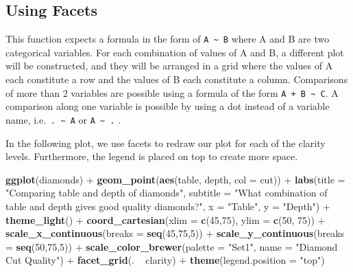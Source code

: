 \documentclass[]{tufte-book}
\newenvironment{Shaded}{}{}
\newcommand{\DataTypeTok}[1]{\textcolor[rgb]{0.56,0.13,0.00}{#1}}
\newcommand{\DecValTok}[1]{\textcolor[rgb]{0.25,0.63,0.44}{#1}}
\newcommand{\KeywordTok}[1]{\textcolor[rgb]{0.00,0.44,0.13}{\textbf{#1}}}
\newcommand{\NormalTok}[1]{#1}
\newcommand{\OperatorTok}[1]{\textcolor[rgb]{0.40,0.40,0.40}{#1}}
\newcommand{\StringTok}[1]{\textcolor[rgb]{0.25,0.44,0.63}{#1}}
\begin{document}
\hypertarget{using-facets}{%
\subsection{Using Facets}\label{using-facets}}

This function expects a formula in the form of \texttt{A\ \textasciitilde{}\ B} where A and B are two categorical variables. For each combination of values of A and B, a different plot will be constructed, and they will be arranged in a grid where the values of A each constitute a row and the values of B each constitute a column. Comparisons of more than 2 variables are possible using a formula of the form \texttt{A\ +\ B\ \textasciitilde{}\ C}. A comparison along one variable is possible by using a dot instead of a variable name, i.e.~\texttt{.\ \textasciitilde{}\ A} or \texttt{A\ \textasciitilde{}\ .} .

In the following plot, we use facets to redraw our plot for each of the clarity levels. Furthermore, the legend is placed on top to create more space.

\begin{Shaded}
\begin{Highlighting}[]
\KeywordTok{ggplot}\NormalTok{(diamonds) }\OperatorTok{+}
\StringTok{    }\KeywordTok{geom_point}\NormalTok{(}\KeywordTok{aes}\NormalTok{(table, depth, }\DataTypeTok{col =}\NormalTok{ cut)) }\OperatorTok{+}\StringTok{ }
\StringTok{    }\KeywordTok{labs}\NormalTok{(}\DataTypeTok{title =} \StringTok{"Comparing table and depth of diamonds"}\NormalTok{,}
         \DataTypeTok{subtitle =} \StringTok{"What combination of table and depth gives good quality diamonds?"}\NormalTok{,}
         \DataTypeTok{x =} \StringTok{"Table"}\NormalTok{,}
         \DataTypeTok{y =} \StringTok{"Depth"}\NormalTok{) }\OperatorTok{+}
\StringTok{    }\KeywordTok{theme_light}\NormalTok{() }\OperatorTok{+}
\StringTok{    }\KeywordTok{coord_cartesian}\NormalTok{(}\DataTypeTok{xlim =} \KeywordTok{c}\NormalTok{(}\DecValTok{45}\NormalTok{,}\DecValTok{75}\NormalTok{), }\DataTypeTok{ylim =} \KeywordTok{c}\NormalTok{(}\DecValTok{50}\NormalTok{, }\DecValTok{75}\NormalTok{)) }\OperatorTok{+}
\StringTok{    }\KeywordTok{scale_x_continuous}\NormalTok{(}\DataTypeTok{breaks =} \KeywordTok{seq}\NormalTok{(}\DecValTok{45}\NormalTok{,}\DecValTok{75}\NormalTok{,}\DecValTok{5}\NormalTok{)) }\OperatorTok{+}
\StringTok{    }\KeywordTok{scale_y_continuous}\NormalTok{(}\DataTypeTok{breaks =} \KeywordTok{seq}\NormalTok{(}\DecValTok{50}\NormalTok{,}\DecValTok{75}\NormalTok{,}\DecValTok{5}\NormalTok{)) }\OperatorTok{+}
\StringTok{    }\KeywordTok{scale_color_brewer}\NormalTok{(}\DataTypeTok{palette =} \StringTok{"Set1"}\NormalTok{, }\DataTypeTok{name =} \StringTok{"Diamond Cut Quality"}\NormalTok{) }\OperatorTok{+}
\StringTok{    }\KeywordTok{facet_grid}\NormalTok{(. }\OperatorTok{~}\StringTok{ }\NormalTok{clarity) }\OperatorTok{+}
\StringTok{    }\KeywordTok{theme}\NormalTok{(}\DataTypeTok{legend.position =} \StringTok{"top"}\NormalTok{)}
\end{Highlighting}
\end{Shaded}
\end{document}

